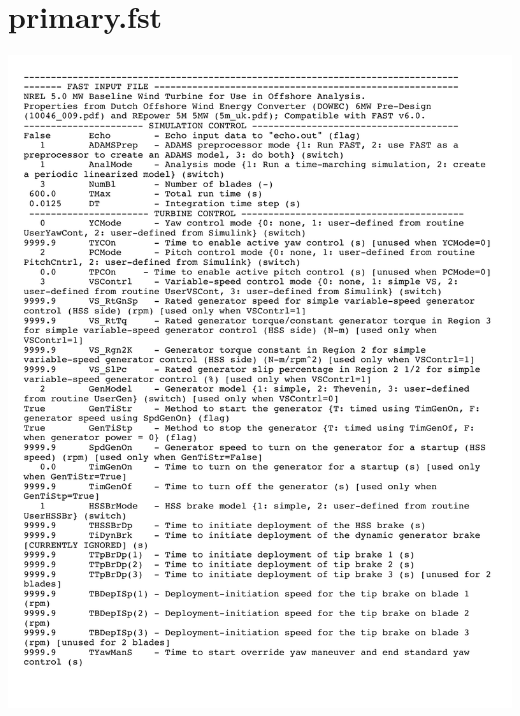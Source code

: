 \pagebreak
\section{primary.fst} \label{sectionA-1}

\noindent
\includegraphics[width=\linewidth]{Figures/AppendixAFigures/primaryP1.pdf}		


